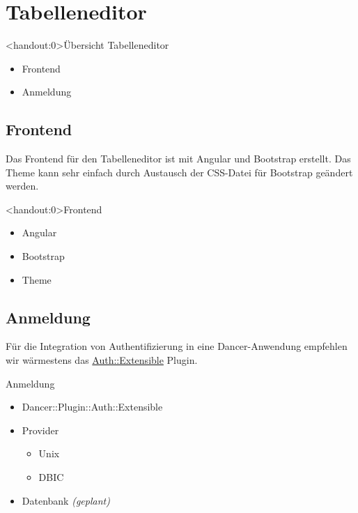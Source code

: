 \section{Tabelleneditor}

\begin{frame}<handout:0>{Übersicht Tabelleneditor}
\begin{itemize}
\item Frontend
\item Anmeldung
\end{itemize}
\end{frame}

\subsection{Frontend}
Das Frontend für den Tabelleneditor ist mit Angular und Bootstrap erstellt.
Das Theme kann sehr einfach durch Austausch der CSS-Datei für Bootstrap
geändert werden.

\begin{frame}<handout:0>{Frontend}
\begin{itemize}
\item Angular
\item Bootstrap
\item Theme
\end{itemize}
\end{frame}

\subsection{Anmeldung}

Für die Integration von Authentifizierung in eine Dancer-Anwendung empfehlen
wir wärmestens das
\href{https://metacpan.org/pod/Dancer::Plugin::Auth::Extensible}{Auth::Extensible}
Plugin.

\begin{frame}{Anmeldung}
\begin{itemize}
\item Dancer::Plugin::Auth::Extensible
\item Provider
\begin{itemize}
\item Unix
\item DBIC
\end{itemize}
\item Datenbank \textit{(geplant)}
\end{itemize}
\end{frame}

